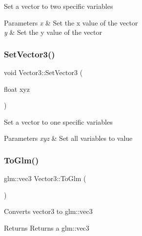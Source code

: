 Set a vector to two specific variables 
\begin{DoxyParams}{Parameters}
{\em x} & Set the x value of the vector \\
\hline
{\em y} & Set the y value of the vector \\
\hline
\end{DoxyParams}
\mbox{\label{struct_vector3_a633ec8762eb0b3aba6f75ca0560e3e2d}} 
\subsubsection{\texorpdfstring{SetVector3()}{SetVector3()}\hspace{0.1cm}{\footnotesize\ttfamily [3/3]}}
{\footnotesize\ttfamily void Vector3\+::\+Set\+Vector3 (\begin{DoxyParamCaption}\item[{float}]{xyz }\end{DoxyParamCaption})\hspace{0.3cm}{\ttfamily [inline]}}

Set a vector to one specific variables 
\begin{DoxyParams}{Parameters}
{\em xyz} & Set all variables to value \\
\hline
\end{DoxyParams}
\mbox{\label{struct_vector3_a6ab2d064413018bcdfbd9d56e69d10a2}} 
\subsubsection{\texorpdfstring{ToGlm()}{ToGlm()}}
{\footnotesize\ttfamily glm\+::vec3 Vector3\+::\+To\+Glm (\begin{DoxyParamCaption}{ }\end{DoxyParamCaption})\hspace{0.3cm}{\ttfamily [inline]}}

Converts vector3 to glm\+::vec3 \begin{DoxyReturn}{Returns}
Returns a glm\+::vec3 
\end{DoxyReturn}
\mbox{\label{struct_vector3_a331c8e16800919307bc3e8507f9459df}} 
